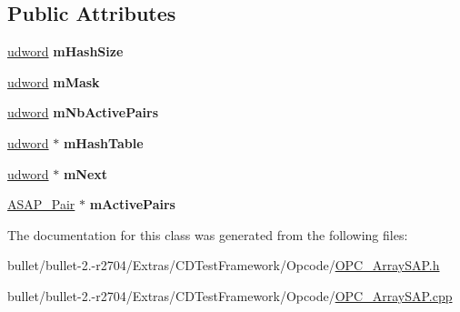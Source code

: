 \subsection*{Public Attributes}
\begin{DoxyCompactItemize}
\item 
\hypertarget{class_a_s_a_p___pair_manager_a7b2e9932c5d9e886d6b1b304e01876c8}{\hyperlink{_ice_types_8h_a44c6f1920ba5551225fb534f9d1a1733}{udword} {\bfseries m\+Hash\+Size}}\label{class_a_s_a_p___pair_manager_a7b2e9932c5d9e886d6b1b304e01876c8}

\item 
\hypertarget{class_a_s_a_p___pair_manager_a172cc45685e7e41e737bf445a1304c92}{\hyperlink{_ice_types_8h_a44c6f1920ba5551225fb534f9d1a1733}{udword} {\bfseries m\+Mask}}\label{class_a_s_a_p___pair_manager_a172cc45685e7e41e737bf445a1304c92}

\item 
\hypertarget{class_a_s_a_p___pair_manager_ac4c0a56ced9b5b007eebca49e5fdc264}{\hyperlink{_ice_types_8h_a44c6f1920ba5551225fb534f9d1a1733}{udword} {\bfseries m\+Nb\+Active\+Pairs}}\label{class_a_s_a_p___pair_manager_ac4c0a56ced9b5b007eebca49e5fdc264}

\item 
\hypertarget{class_a_s_a_p___pair_manager_a19c97d79c48bb321420e3020c6b51b40}{\hyperlink{_ice_types_8h_a44c6f1920ba5551225fb534f9d1a1733}{udword} $\ast$ {\bfseries m\+Hash\+Table}}\label{class_a_s_a_p___pair_manager_a19c97d79c48bb321420e3020c6b51b40}

\item 
\hypertarget{class_a_s_a_p___pair_manager_a0248fc05f4060f11a0ed0093bc216a0d}{\hyperlink{_ice_types_8h_a44c6f1920ba5551225fb534f9d1a1733}{udword} $\ast$ {\bfseries m\+Next}}\label{class_a_s_a_p___pair_manager_a0248fc05f4060f11a0ed0093bc216a0d}

\item 
\hypertarget{class_a_s_a_p___pair_manager_acf9207852308e44fea09b702c2c0e726}{\hyperlink{struct_a_s_a_p___pair}{A\+S\+A\+P\+\_\+\+Pair} $\ast$ {\bfseries m\+Active\+Pairs}}\label{class_a_s_a_p___pair_manager_acf9207852308e44fea09b702c2c0e726}

\end{DoxyCompactItemize}


The documentation for this class was generated from the following files\+:\begin{DoxyCompactItemize}
\item 
bullet/bullet-\/2.-\/r2704/\+Extras/\+C\+D\+Test\+Framework/\+Opcode/\hyperlink{_o_p_c___array_s_a_p_8h}{O\+P\+C\+\_\+\+Array\+S\+A\+P.\+h}\item 
bullet/bullet-\/2.-\/r2704/\+Extras/\+C\+D\+Test\+Framework/\+Opcode/\hyperlink{_o_p_c___array_s_a_p_8cpp}{O\+P\+C\+\_\+\+Array\+S\+A\+P.\+cpp}\end{DoxyCompactItemize}
